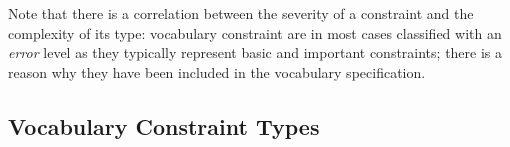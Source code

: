 \documentclass{llncs}
\newcommand{\tb}[1]{\todo[size=\small, color=green!40]{\textbf{Thomas:} #1}}
\begin{document}
Note that there is a correlation between the severity of a constraint and the complexity of its type: vocabulary constraint are in most cases classified with an \emph{error} level as they typically represent basic and important constraints; there is a reason why they have been included in the vocabulary specification.


%
%
%

%


\subsection{Vocabulary Constraint Types}
\label{vocabulary-constraint-types}
\end{document}
